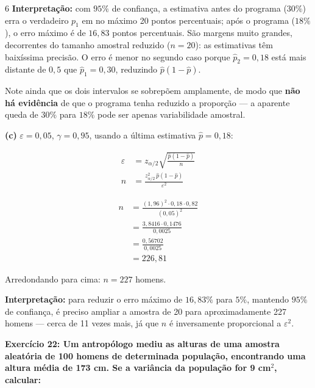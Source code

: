 \documentclass[8pt, a4paper, landscape]{extarticle}
\begin{document}
\begin{multicols}{6}
\textbf{Interpretação:} com $95\%$ de confiança, a estimativa antes do programa ($30\%$) erra o verdadeiro $p_1$ em no máximo 20 pontos percentuais; após o programa ($18\%$), o erro máximo é de $16,83$ pontos percentuais. São margens muito grandes, decorrentes do tamanho amostral reduzido ($n = 20$): as estimativas têm baixíssima precisão. O erro é menor no segundo caso porque $\hat{p}_2 = 0,18$ está mais distante de $0,5$ que $\hat{p}_1 = 0,30$, reduzindo $\hat{p}(1-\hat{p})$.

Note ainda que os dois intervalos se sobrepõem amplamente, de modo que \textbf{não há evidência} de que o programa tenha reduzido a proporção — a aparente queda de $30\%$ para $18\%$ pode ser apenas variabilidade amostral.

\vspace{0.2cm}

\textbf{(c)} $\varepsilon = 0,05$, $\gamma = 0,95$, usando a última estimativa $\hat{p} = 0,18$:

\begin{equation*}
\begin{split}
\varepsilon &= z_{\alpha/2}\sqrt{\frac{\hat{p}(1-\hat{p})}{n}} \\
n &= \frac{z_{\alpha/2}^2\,\hat{p}(1-\hat{p})}{\varepsilon^2}
\end{split}
\end{equation*}

\begin{equation*}
\begin{split}
n &= \frac{(1,96)^2 \cdot 0,18 \cdot 0,82}{(0,05)^2} \\
&= \frac{3,8416 \cdot 0,1476}{0,0025} \\
&= \frac{0,56702}{0,0025} \\
&= 226,81
\end{split}
\end{equation*}

Arredondando para cima: $n = 227$ homens.

\textbf{Interpretação:} para reduzir o erro máximo de $16,83\%$ para $5\%$, mantendo $95\%$ de confiança, é preciso ampliar a amostra de 20 para aproximadamente 227 homens — cerca de 11 vezes mais, já que $n$ é inversamente proporcional a $\varepsilon^2$.

\textbf{Exercício 22: Um antropólogo mediu as alturas de uma amostra aleatória de 100 homens de determinada população, encontrando uma altura média de 173 cm. Se a variância da população for 9 cm$^2$, calcular:}


\end{multicols}
\end{document}
